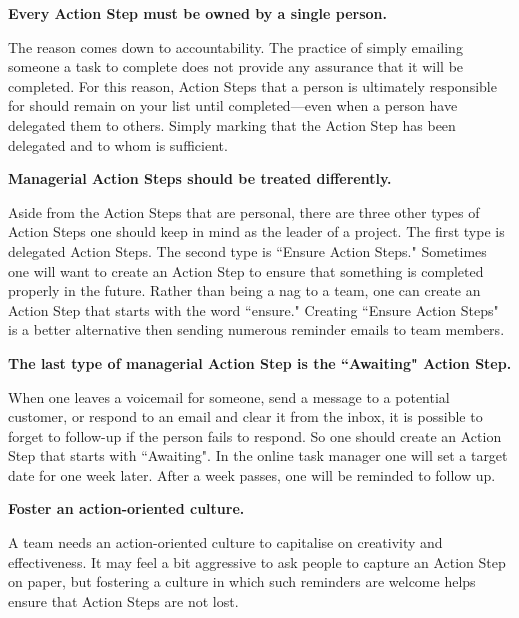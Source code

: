 \textbf{Every Action Step must be owned by a single person.}

The reason comes down to accountability. The practice of simply emailing someone a task to complete does not provide any assurance that it will be completed. For this reason, Action Steps that a person is ultimately responsible for should remain on your list until completed—even when a person have delegated them to others. Simply marking that the Action Step has been delegated and to whom is sufficient.

\textbf{Managerial Action Steps should be treated differently.}

Aside from the Action Steps that are personal, there are three other types of Action Steps one should keep in mind as the leader of a project. The first type is delegated Action Steps. The second type is ``Ensure Action Steps." Sometimes one will want to create an Action Step to ensure that something is completed properly in the future. Rather than being a nag to a  team, one can create an Action Step that starts with the word ``ensure." Creating ``Ensure Action Steps" is a better alternative then sending numerous reminder emails to team members.

\textbf{The last type of managerial Action Step is the ``Awaiting" Action Step.}

When one leaves a voicemail for someone, send a message to a potential customer, or respond to an email and clear it from the inbox, it is possible to forget to follow-up if the person fails to respond. So one should create an Action Step that starts with ``Awaiting". In the online task manager one will set a target date for one week later. After a week passes, one will be reminded to follow up.

\textbf{Foster an action-oriented culture.}

A team needs an action-oriented culture to capitalise on creativity and effectiveness. It may feel a bit aggressive to ask people to capture an Action Step on paper, but fostering a culture in which such reminders are welcome helps ensure that Action Steps are not lost.


